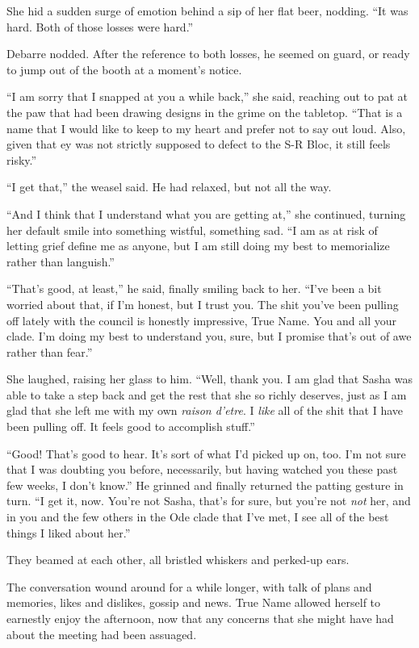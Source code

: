 She hid a sudden surge of emotion behind a sip of her flat beer, nodding. ``It was hard. Both of those losses were hard.''

Debarre nodded. After the reference to both losses, he seemed on guard, or ready to jump out of the booth at a moment's notice.

``I am sorry that I snapped at you a while back,'' she said, reaching out to pat at the paw that had been drawing designs in the grime on the tabletop. ``That is a name that I would like to keep to my heart and prefer not to say out loud. Also, given that ey was not strictly supposed to defect to the S-R Bloc, it still feels risky.''

``I get that,'' the weasel said. He had relaxed, but not all the way.

``And I think that I understand what you are getting at,'' she continued, turning her default smile into something wistful, something sad. ``I am as at risk of letting grief define me as anyone, but I am still doing my best to memorialize rather than languish.''

``That's good, at least,'' he said, finally smiling back to her. ``I've been a bit worried about that, if I'm honest, but I trust you. The shit you've been pulling off lately with the council is honestly impressive, True Name. You and all your clade. I'm doing my best to understand you, sure, but I promise that's out of awe rather than fear.''

She laughed, raising her glass to him. ``Well, thank you. I am glad that Sasha was able to take a step back and get the rest that she so richly deserves, just as I am glad that she left me with my own \emph{raison d'etre}. I \emph{like} all of the shit that I have been pulling off. It feels good to accomplish stuff.''

``Good! That's good to hear. It's sort of what I'd picked up on, too. I'm not sure that I was doubting you before, necessarily, but having watched you these past few weeks, I don't know.'' He grinned and finally returned the patting gesture in turn. ``I get it, now. You're not Sasha, that's for sure, but you're not \emph{not} her, and in you and the few others in the Ode clade that I've met, I see all of the best things I liked about her.''

They beamed at each other, all bristled whiskers and perked-up ears.

The conversation wound around for a while longer, with talk of plans and memories, likes and dislikes, gossip and news. True Name allowed herself to earnestly enjoy the afternoon, now that any concerns that she might have had about the meeting had been assuaged.

